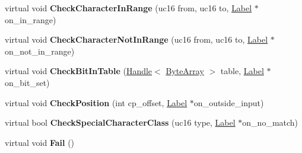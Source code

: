 \begin{DoxyCompactItemize}
\item 
virtual void {\bfseries Check\+Character\+In\+Range} (uc16 from, uc16 to, \hyperlink{classv8_1_1internal_1_1_label}{Label} $\ast$on\+\_\+in\+\_\+range)\hypertarget{classv8_1_1internal_1_1_reg_exp_macro_assembler_tracer_a88ae4bc8b44d8c2cf8f15efba8902a06}{}\label{classv8_1_1internal_1_1_reg_exp_macro_assembler_tracer_a88ae4bc8b44d8c2cf8f15efba8902a06}

\item 
virtual void {\bfseries Check\+Character\+Not\+In\+Range} (uc16 from, uc16 to, \hyperlink{classv8_1_1internal_1_1_label}{Label} $\ast$on\+\_\+not\+\_\+in\+\_\+range)\hypertarget{classv8_1_1internal_1_1_reg_exp_macro_assembler_tracer_a3b7297dd1fb23572b2ae82917f6b25ef}{}\label{classv8_1_1internal_1_1_reg_exp_macro_assembler_tracer_a3b7297dd1fb23572b2ae82917f6b25ef}

\item 
virtual void {\bfseries Check\+Bit\+In\+Table} (\hyperlink{classv8_1_1internal_1_1_handle}{Handle}$<$ \hyperlink{classv8_1_1internal_1_1_byte_array}{Byte\+Array} $>$ table, \hyperlink{classv8_1_1internal_1_1_label}{Label} $\ast$on\+\_\+bit\+\_\+set)\hypertarget{classv8_1_1internal_1_1_reg_exp_macro_assembler_tracer_adff9d22a692e7826d5e2270885d5b772}{}\label{classv8_1_1internal_1_1_reg_exp_macro_assembler_tracer_adff9d22a692e7826d5e2270885d5b772}

\item 
virtual void {\bfseries Check\+Position} (int cp\+\_\+offset, \hyperlink{classv8_1_1internal_1_1_label}{Label} $\ast$on\+\_\+outside\+\_\+input)\hypertarget{classv8_1_1internal_1_1_reg_exp_macro_assembler_tracer_a4932757962d8c912c4fca2b4d4ebfc08}{}\label{classv8_1_1internal_1_1_reg_exp_macro_assembler_tracer_a4932757962d8c912c4fca2b4d4ebfc08}

\item 
virtual bool {\bfseries Check\+Special\+Character\+Class} (uc16 type, \hyperlink{classv8_1_1internal_1_1_label}{Label} $\ast$on\+\_\+no\+\_\+match)\hypertarget{classv8_1_1internal_1_1_reg_exp_macro_assembler_tracer_aeca8d834eb28764868092a5dedc3b5f1}{}\label{classv8_1_1internal_1_1_reg_exp_macro_assembler_tracer_aeca8d834eb28764868092a5dedc3b5f1}

\item 
virtual void {\bfseries Fail} ()\hypertarget{classv8_1_1internal_1_1_reg_exp_macro_assembler_tracer_adf94a12665d114768a17dcaf27fb429e}{}\label{classv8_1_1internal_1_1_reg_exp_macro_assembler_tracer_adf94a12665d114768a17dcaf27fb429e}


\end{DoxyCompactItemize}
